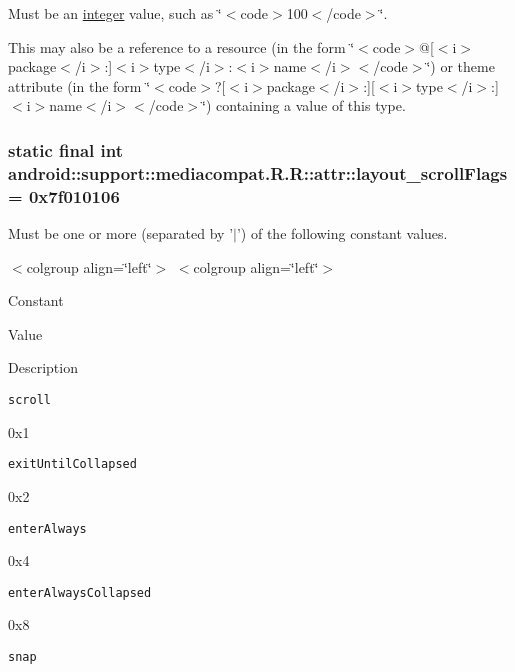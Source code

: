 Must be an \hyperlink{classandroid_1_1support_1_1mediacompat_1_1_r_1_1integer}{integer} value, such as \char`\"{}$<$code$>$100$<$/code$>$\char`\"{}. 

This may also be a reference to a resource (in the form \char`\"{}$<$code$>$@\mbox{[}$<$i$>$package$<$/i$>$:\mbox{]}$<$i$>$type$<$/i$>$:$<$i$>$name$<$/i$>$$<$/code$>$\char`\"{}) or theme attribute (in the form \char`\"{}$<$code$>$?\mbox{[}$<$i$>$package$<$/i$>$:\mbox{]}\mbox{[}$<$i$>$type$<$/i$>$:\mbox{]}$<$i$>$name$<$/i$>$$<$/code$>$\char`\"{}) containing a value of this type. \hypertarget{classandroid_1_1support_1_1mediacompat_1_1_r_1_1attr_50e7250c21b50a9dfc5b626f9de5aec4}{
\subsubsection[{layout\_\-scrollFlags}]{\setlength{\rightskip}{0pt plus 5cm}static final int android::support::mediacompat.R.R::attr::layout\_\-scrollFlags = 0x7f010106}}
\label{classandroid_1_1support_1_1mediacompat_1_1_r_1_1attr_50e7250c21b50a9dfc5b626f9de5aec4}


Must be one or more (separated by '$|$') of the following constant values. \begin{TabularC}{0}
\hline
\end{TabularC}
$<$colgroup align=\char`\"{}left\char`\"{}$>$ $<$colgroup align=\char`\"{}left\char`\"{}$>$ 

Constant

Value

Description 

{\tt scroll}

0x1

{\tt exitUntilCollapsed}

0x2

{\tt enterAlways}

0x4

{\tt enterAlwaysCollapsed}

0x8

{\tt snap}

